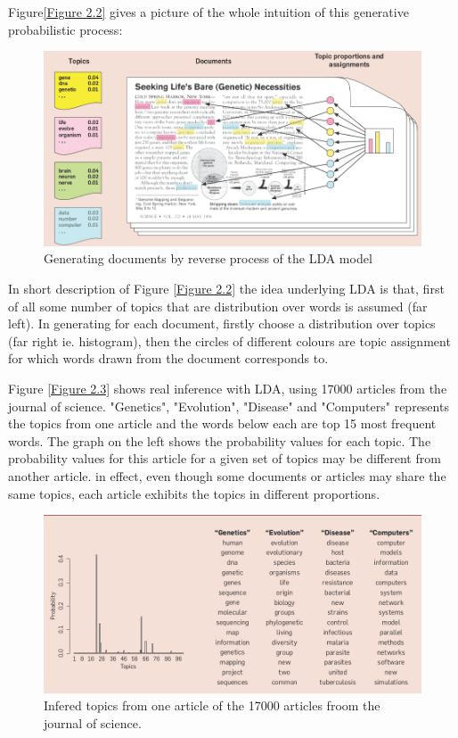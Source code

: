 Figure\eqref{Figure 2.2}  gives a picture of the whole intuition of this generative probabilistic process:

\begin{figure}[hbtp]
\centering
\includegraphics[scale=0.5]{DLA.png}
\caption{Generating documents by reverse process of the LDA model}\label{Figure 2.2}
\end{figure}
In short description of Figure \eqref{Figure 2.2} the idea underlying LDA is that, first of all some number of topics that are distribution over words is assumed (far left). In generating for each document, firstly choose a distribution over topics (far right ie. histogram), then the circles of different colours are topic assignment for which words drawn from the document corresponds to.

Figure \eqref{Figure 2.3} shows real inference with LDA, using 17000 articles from the journal of science. "Genetics", "Evolution", "Disease" and "Computers" represents the topics  from one article and the words below each are top 15 most frequent words. The graph on the left shows the probability values for each topic.
The probability values for this article for a given set of topics may be different from another article. in effect, even though some documents or articles may share the same topics, each article exhibits the topics in different proportions.
\begin{figure}[hbtp]
\centering
\includegraphics[scale=0.5]{infered_topics.png}
\caption{Infered topics from one article of the 17000 articles froom the journal of science.}
\label{Figure 2.3}
 \end{figure} 
